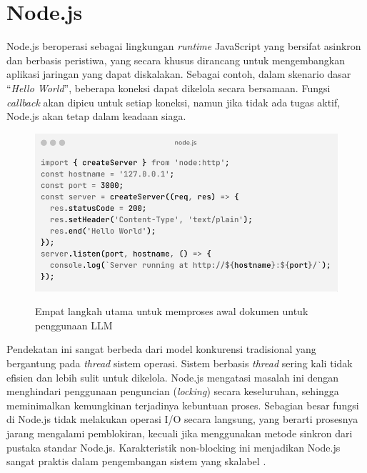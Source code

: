 \section{Node.js}

Node.js beroperasi sebagai lingkungan \textit{runtime} JavaScript yang bersifat asinkron dan berbasis peristiwa, yang secara khusus dirancang untuk mengembangkan aplikasi jaringan yang dapat diskalakan. Sebagai contoh, dalam skenario dasar ``\textit{Hello World}'', beberapa koneksi dapat dikelola secara bersamaan. Fungsi \textit{callback} akan dipicu untuk setiap koneksi, namun jika tidak ada tugas aktif, Node.js akan tetap dalam keadaan siaga.

\begin{figure}[htbp]
  \centering
  \includegraphics[width=0.85\linewidth]{images/bab-2/nodejs.png}
  \caption{Empat langkah utama untuk memproses awal dokumen untuk penggunaan LLM}\label{fig:nodejs-server}\citep{nodejs2025about}
\end{figure}

Pendekatan ini sangat berbeda dari model konkurensi tradisional yang bergantung pada \textit{thread} sistem operasi. Sistem berbasis \textit{thread} sering kali tidak efisien dan lebih sulit untuk dikelola. Node.js mengatasi masalah ini dengan menghindari penggunaan penguncian (\textit{locking}) secara keseluruhan, sehingga meminimalkan kemungkinan terjadinya kebuntuan proses. 
\singlespacing{}
Sebagian besar fungsi di Node.js tidak melakukan operasi I/O secara langsung, yang berarti prosesnya jarang mengalami pemblokiran, kecuali jika menggunakan metode sinkron dari pustaka standar Node.js. Karakteristik non-blocking ini menjadikan Node.js sangat praktis dalam pengembangan sistem yang skalabel \citep{nodejs2025about}.

